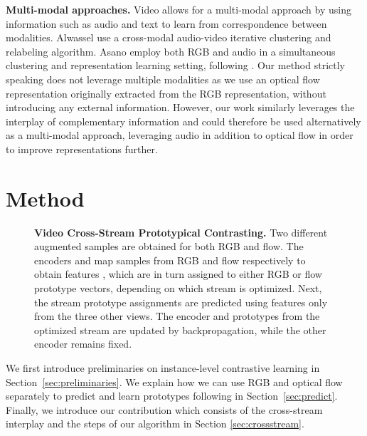 \documentclass[10pt,twocolumn,letterpaper]{article}
\begin{document}
\textbf{Multi-modal approaches.} Video allows for a multi-modal approach by using information such as audio \cite{alwassel_self-supervised_2020, asano_labelling_2020} and text \cite{miech_end--end_2020, sun_learning_2019} to learn from correspondence between modalities. Alwassel \etal \cite{alwassel_self-supervised_2020} use a cross-modal audio-video iterative clustering and relabeling algorithm. Asano \etal \cite{asano_labelling_2020} employ both RGB and audio in a simultaneous clustering and representation learning setting, following \cite{asano_self-labelling_2020}. Our method strictly speaking does not leverage multiple modalities as we use an optical flow representation originally extracted from the RGB representation, without introducing any external information. However, our work similarly leverages the interplay of complementary information and could therefore be used alternatively as a multi-modal approach, \eg leveraging audio in addition to optical flow in order to improve representations further. 



 \section{Method}
\label{sec:method}

\begin{figure*}[ht]
\begin{center}
\end{center}
   \caption{\textbf{Video Cross-Stream Prototypical Contrasting.} Two different augmented samples are obtained for both RGB and flow. The encoders  and  map samples from RGB and flow respectively to obtain features , which are in turn assigned to either RGB or flow prototype vectors, depending on which stream  is optimized. Next, the stream prototype assignments  are predicted using features only from the three other views. The encoder and prototypes from the optimized stream are updated by backpropagation, while the other encoder remains fixed.}
\label{fig:method}
\end{figure*}
We first introduce preliminaries on instance-level contrastive learning in Section~\ref{sec:preliminaries}. We explain how we can use RGB and optical flow separately to predict and learn prototypes following \cite{caron_unsupervised_2020} in Section~\ref{sec:predict}. Finally, we introduce our contribution which consists of the cross-stream interplay and the steps of our algorithm in Section \ref{sec:crossstream}.
\end{document}
